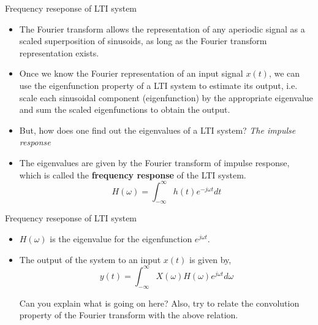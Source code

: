 \documentclass{beamer}
\begin{document}
\begin{frame}{Frequency reseponse of LTI system}

\begin{itemize}
\item The Fourier transform allows the representation of any aperiodic signal as a scaled superposition of sinusoids, as long as the Fourier transform representation exists.

\item Once we know the Fourier representation of an input signal $x(t)$, we can use the eigenfunction property of a LTI system to estimate its output, i.e. scale each sinusoidal component (eigenfunction) by the appropriate eigenvalue and sum the scaled eigenfunctions to obtain the output.

\item But, how does one find out the eigenvalues of a LTI system? \textit{The impulse response}

\item The eigenvalues are given by the Fourier transform of impulse response, which is called the \textbf{frequency response} of the LTI system.
\[ H\left(\omega\right) = \int_{-\infty}^{\infty}h(t)e^{-j\omega t}dt \]

\end{itemize}

\end{frame}


\begin{frame}{Frequency reseponse of LTI system}

\begin{itemize}
\item $H(\omega)$ is the eigenvalue for the eigenfunction $e^{j\omega t}$.
\item The output of the system to an input $x(t)$ is given by,
\[ y(t) = \int_{-\infty}^{\infty} X(\omega)H(\omega)e^{j\omega t} d\omega \]

Can you explain what is going on here? Also, try to relate the convolution property of the Fourier transform with the above relation.

\end{itemize}

\end{frame}
\end{document}
